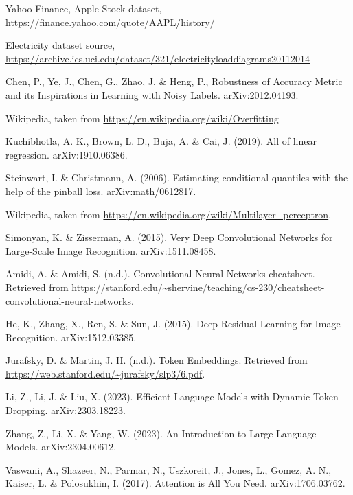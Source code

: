 
\begin{thebibliography}{99}


	 Yahoo Finance, Apple Stock dataset, \url{https://finance.yahoo.com/quote/AAPL/history/}

	 Electricity dataset source, \url{https://archive.ics.uci.edu/dataset/321/electricityloaddiagrams20112014}

	Chen, P., Ye, J., Chen, G., Zhao, J. \& Heng, P.,
	Robustness of Accuracy Metric and its Inspirations in Learning with Noisy Labels. arXiv:2012.04193.

	 Wikipedia, taken from \url{https://en.wikipedia.org/wiki/Overfitting}

	 Kuchibhotla, A. K., Brown, L. D., Buja, A. \& Cai, J. (2019). All of linear regression. arXiv:1910.06386.

	 Steinwart, I. \& Christmann, A. (2006). Estimating conditional quantiles with the help of the pinball loss. arXiv:math/0612817.

	 Wikipedia, taken from \url{https://en.wikipedia.org/wiki/Multilayer_perceptron}.

	 Simonyan, K. \& Zisserman, A. (2015). Very Deep Convolutional Networks for Large-Scale Image Recognition. arXiv:1511.08458.

	 Amidi, A. \& Amidi, S. (n.d.). Convolutional Neural Networks cheatsheet. Retrieved from \url{https://stanford.edu/~shervine/teaching/cs-230/cheatsheet-convolutional-neural-networks}.

	 He, K., Zhang, X., Ren, S. \& Sun, J. (2015). Deep Residual Learning for Image Recognition. arXiv:1512.03385.

	 Jurafsky, D. \& Martin, J. H. (n.d.). Token Embeddings. Retrieved from \url{https://web.stanford.edu/~jurafsky/slp3/6.pdf}.

	 Li, Z., Li, J. \& Liu, X. (2023). Efficient Language Models with Dynamic Token Dropping. arXiv:2303.18223.

	 Zhang, Z., Li, X. \& Yang, W. (2023). An Introduction to Large Language Models. arXiv:2304.00612.

	 Vaswani, A., Shazeer, N., Parmar, N., Uszkoreit, J., Jones, L., Gomez, A. N., Kaiser, L. \& Polosukhin, I. (2017). Attention is All You Need. arXiv:1706.03762.


\end{thebibliography}
